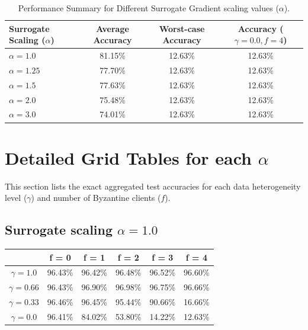 \documentclass{article}
\begin{document}
\begin{table}[htbp]
    \centering
    \caption{Performance Summary for Different Surrogate Gradient scaling values ($\alpha$).}
    \label{tab:summary}
    \begin{tabular}{lccc}
        \toprule
        \textbf{Surrogate Scaling ($\alpha$)} & \textbf{Average Accuracy} & \textbf{Worst-case Accuracy} & \textbf{Accuracy ($\gamma=0.0, f=4$)} \\
        \midrule
        $\alpha = 1.0$ & 81.15\% & 12.63\% & 12.63\% \\
        $\alpha = 1.25$ & 77.70\% & 12.63\% & 12.63\% \\
        $\alpha = 1.5$ & 77.63\% & 12.63\% & 12.63\% \\
        $\alpha = 2.0$ & 75.48\% & 12.63\% & 12.63\% \\
        $\alpha = 3.0$ & 74.01\% & 12.63\% & 12.63\% \\
        \bottomrule
    \end{tabular}
\end{table}

\section{Detailed Grid Tables for each $\alpha$}
This section lists the exact aggregated test accuracies for each data heterogeneity level ($\gamma$) and number of Byzantine clients ($f$).

\subsection{Surrogate scaling $\alpha = 1.0$}
\begin{table}[htbp]
    \centering
    \begin{tabular}{cccccc}
        \toprule
        & \textbf{f = 0} & \textbf{f = 1} & \textbf{f = 2} & \textbf{f = 3} & \textbf{f = 4} \\
        \midrule
        $\gamma = 1.0$ & 96.43\% & 96.42\% & 96.48\% & 96.52\% & 96.60\% \\
        $\gamma = 0.66$ & 96.43\% & 96.90\% & 96.98\% & 96.75\% & 96.66\% \\
        $\gamma = 0.33$ & 96.46\% & 96.45\% & 95.44\% & 90.66\% & 16.66\% \\
        $\gamma = 0.0$ & 96.41\% & 84.02\% & 53.80\% & 14.22\% & 12.63\% \\
        \bottomrule
    \end{tabular}
\end{table}
\end{document}
